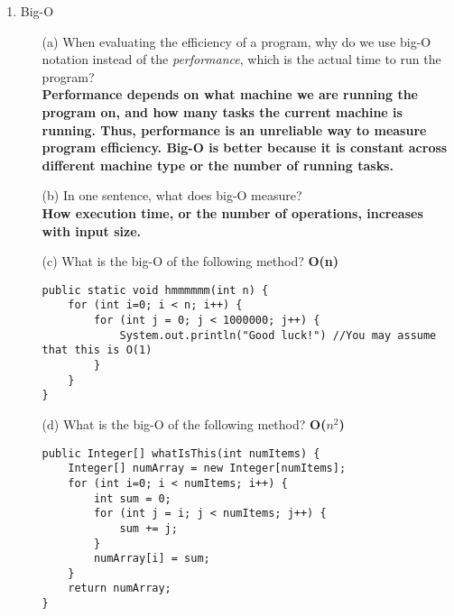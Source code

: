 \documentclass[letter]{article}
\begin{document}
\begin{enumerate} [1.]
    \item Big-O
    \begin{itemize}
        \item [(a)] When evaluating the efficiency of a program, why do we use big-O notation instead of the \textit{performance}, which is the actual time to run the program?\\

        \textbf{Performance depends on what machine we are running the program on, and how many tasks the current machine is running. Thus, performance is an unreliable way to measure program efficiency. Big-O is better because it is constant across different machine type or the number of running tasks.\\}
                    
        \item [(b)] In one sentence, what does big-O measure?\\

        \textbf{How execution time, or the number of operations, increases with input size.\\}

        \item [(c)] What is the big-O of the following method? \textbf{O(n)}

        \begin{verbatim}
public static void hmmmmmm(int n) {
    for (int i=0; i < n; i++) {
        for (int j = 0; j < 1000000; j++) {
            System.out.println("Good luck!") //You may assume that this is O(1)
        }
    }
}
        \end{verbatim}
        \item [(d)] What is the big-O of the following method? \textbf{O($n^2$)}

\begin{verbatim}
public Integer[] whatIsThis(int numItems) {
    Integer[] numArray = new Integer[numItems];
    for (int i=0; i < numItems; i++) {
        int sum = 0;
        for (int j = i; j < numItems; j++) {
            sum += j;
        }
        numArray[i] = sum;
    }
    return numArray;
}
\end{verbatim}
        

        
    \end{itemize}    
\end{enumerate}
\end{document}
